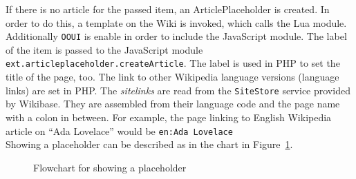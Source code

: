If there is no article for the passed item, an ArticlePlaceholder is created. In order to do this, a template on the Wiki is invoked, which calls the Lua module. Additionally \texttt{\justify OOUI} is enable in order to include the JavaScript module. The label of the item is passed to the JavaScript module \texttt{\justify ext.articleplaceholder.createArticle}. The label is used in PHP to set the title of the page, too. The link to other Wikipedia language versions (language links) are set in PHP. The \textit{sitelinks} are read from the \texttt{\justify SiteStore} service provided by Wikibase. They are assembled from their language code and the page name with a colon in between. For example, the page linking to English Wikipedia article on ``Ada Lovelace'' would be \texttt{\justify en:Ada Lovelace}\\
Showing a placeholder can be described as in the chart in Figure~\ref{fig:showpl}. 
\begin{figure}[H]
	\centering
	
	\caption{Flowchart for showing a placeholder}
	\label{fig:showpl}
\end{figure}
